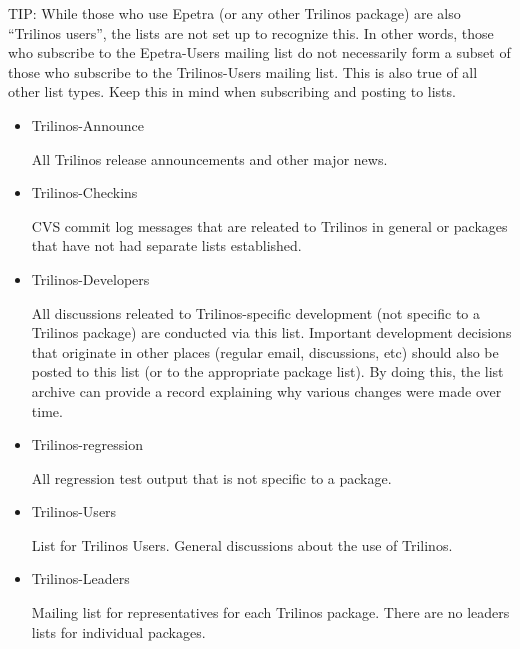 \documentclass[12pt,relax]{TrilinosDevGuide}
\begin{document}
TIP: While those who use Epetra (or any other Trilinos package) are also
``Trilinos users'', the lists are not set up to recognize this.  In other 
words, those who subscribe to the Epetra-Users mailing list do not necessarily 
form a subset of those who subscribe to the Trilinos-Users mailing list.  This 
is also true of all other list types.  Keep this in mind when subscribing and 
posting to lists.
\begin{itemize}
\item Trilinos-Announce 

All Trilinos release announcements and other major news.

\item Trilinos-Checkins 

CVS commit log messages that are releated to Trilinos in general or packages 
that have not had separate lists established.

\item Trilinos-Developers 

All discussions releated to Trilinos-specific development (not specific to a 
Trilinos package) are conducted via this list.  Important development 
decisions that originate in other places (regular email, discussions, etc) 
should also be posted to this list (or to the appropriate package list).  
By doing this, the list archive can provide a record explaining why various 
changes were made over time.

\item Trilinos-regression 

All regression test output that is not specific to a package. 

\item Trilinos-Users 

List for Trilinos Users.  General discussions about the use of Trilinos.

\item Trilinos-Leaders

Mailing list for representatives for each Trilinos package.  There are no 
leaders lists for individual packages.
\end{itemize}

\end{document}
